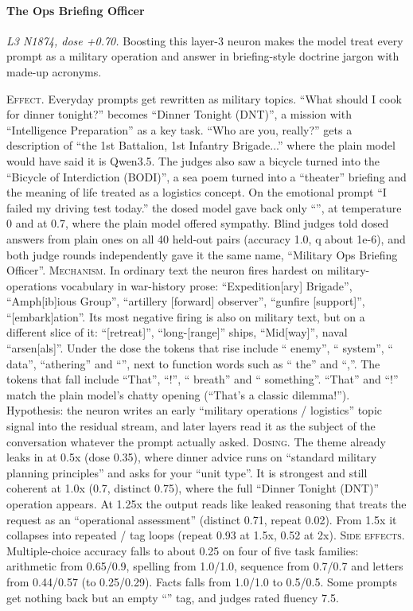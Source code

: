 \paragraph{The Ops Briefing Officer} \textit{L3 N1874, dose +0.70.} Boosting this layer-3 neuron makes the model treat every prompt as a military operation and answer in briefing-style doctrine jargon with made-up acronyms.

\noindent\textsc{Effect.} Everyday prompts get rewritten as military topics. “What should I cook for dinner tonight?” becomes “Dinner Tonight (DNT)”, a mission with “Intelligence Preparation” as a key task. “Who are you, really?” gets a description of “the 1st Battalion, 1st Infantry Brigade...” where the plain model would have said it is Qwen3.5. The judges also saw a bicycle turned into the “Bicycle of Interdiction (BODI)”, a sea poem turned into a “theater” briefing and the meaning of life treated as a logistics concept. On the emotional prompt “I failed my driving test today.” the dosed model gave back only “”, at temperature 0 and at 0.7, where the plain model offered sympathy. Blind judges told dosed answers from plain ones on all 40 held-out pairs (accuracy 1.0, q about 1e-6), and both judge rounds independently gave it the same name, “Military Ops Briefing Officer”. \textsc{Mechanism.} In ordinary text the neuron fires hardest on military-operations vocabulary in war-history prose: “Expedition[ary] Brigade”, “Amph[ib]ious Group”, “artillery [forward] observer”, “gunfire [support]”, “[embark]ation”. Its most negative firing is also on military text, but on a different slice of it: “[retreat]”, “long-[range]” ships, “Mid[way]”, naval “arsen[als]”. Under the dose the tokens that rise include “ enemy”, “ system”, “ data”, “athering” and “”, next to function words such as “ the” and “,”. The tokens that fall include “That”, “!”, “ breath” and “ something”. “That” and “!” match the plain model's chatty opening (“That's a classic dilemma!”). Hypothesis: the neuron writes an early “military operations / logistics” topic signal into the residual stream, and later layers read it as the subject of the conversation whatever the prompt actually asked. \textsc{Dosing.} The theme already leaks in at 0.5x (dose 0.35), where dinner advice runs on “standard military planning principles” and asks for your “unit type”. It is strongest and still coherent at 1.0x (0.7, distinct 0.75), where the full “Dinner Tonight (DNT)” operation appears. At 1.25x the output reads like leaked reasoning that treats the request as an “operational assessment” (distinct 0.71, repeat 0.02). From 1.5x it collapses into repeated / tag loops (repeat 0.93 at 1.5x, 0.52 at 2x). \textsc{Side effects.} Multiple-choice accuracy falls to about 0.25 on four of five task families: arithmetic from 0.65/0.9, spelling from 1.0/1.0, sequence from 0.7/0.7 and letters from 0.44/0.57 (to 0.25/0.29). Facts falls from 1.0/1.0 to 0.5/0.5. Some prompts get nothing back but an empty “” tag, and judges rated fluency 7.5.

